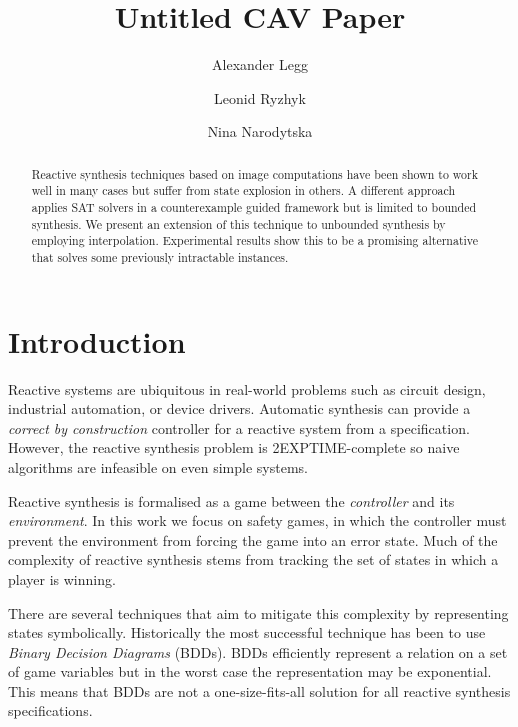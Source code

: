 \documentclass{llncs}
\begin{document}
\title{Untitled CAV Paper}

\author{Alexander Legg 
    \and Leonid Ryzhyk
    \and Nina Narodytska}


\maketitle

\begin{abstract}

    Reactive synthesis techniques based on image computations have been shown
    to work well in many cases but suffer from state explosion in others.
    A different approach applies SAT solvers in a counterexample guided framework but
    is limited to bounded synthesis.  We present an extension of this technique
    to unbounded synthesis by employing interpolation.  Experimental results
    show this to be a promising alternative that solves some previously
    intractable instances.

\end{abstract}

\section{Introduction}

Reactive systems are ubiquitous in real-world problems such as circuit design,
industrial automation, or device drivers. Automatic synthesis can provide a
\emph{correct by construction} controller for a reactive system from a
specification.  However, the reactive synthesis problem is 2EXPTIME-complete so
naive algorithms are infeasible on even simple systems.

Reactive synthesis is formalised as a game between the \emph{controller} and
its \emph{environment}. In this work we focus on safety games, in which the
controller must prevent the environment from forcing the game into an error
state.  Much of the complexity of reactive synthesis stems from tracking the
set of states in which a player is winning.

There are several techniques that aim to mitigate this complexity by
representing states symbolically.  Historically the most successful technique
has been to use \emph{Binary Decision Diagrams} (BDDs).  BDDs efficiently
represent a relation on a set of game variables but in the worst case the
representation may be exponential. This means that BDDs are not a
one-size-fits-all solution for all reactive synthesis specifications.
\end{document}
